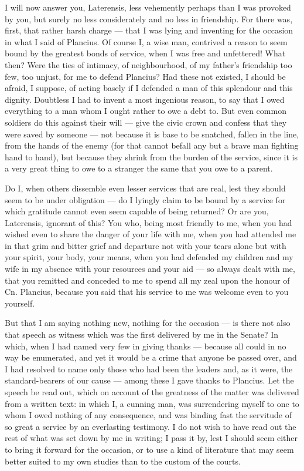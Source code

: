  I will now answer you, Laterensis, less vehemently perhaps than I was provoked by you, but surely no less considerately and no less in friendship. For there was, first, that rather harsh charge --- that I was lying and inventing for the occasion in what I said of Plancius. Of course I, a wise man, contrived a reason to seem bound by the greatest bonds of service, when I was free and unfettered! What then? Were the ties of intimacy, of neighbourhood, of my father's friendship too few, too unjust, for me to defend Plancius? Had these not existed, I should be afraid, I suppose, of acting basely if I defended a man of this splendour and this dignity. Doubtless I had to invent a most ingenious reason, to say that I owed everything to a man whom I ought rather to owe a debt to. But even common soldiers do this against their will --- give the civic crown and confess that they were saved by someone --- not because it is base to be snatched, fallen in the line, from the hands of the enemy (for that cannot befall any but a brave man fighting hand to hand), but because they shrink from the burden of the service, since it is a very great thing to owe to a stranger the same that you owe to a parent.

 Do I, when others dissemble even lesser services that are real, lest they should seem to be under obligation --- do I lyingly claim to be bound by a service for which gratitude cannot even seem capable of being returned? Or are you, Laterensis, ignorant of this? You who, being most friendly to me, when you had wished even to share the danger of your life with me, when you had attended me in that grim and bitter grief and departure not with your tears alone but with your spirit, your body, your means, when you had defended my children and my wife in my absence with your resources and your aid --- so always dealt with me, that you remitted and conceded to me to spend all my zeal upon the honour of Cn. Plancius, because you said that his service to me was welcome even to you yourself.

 But that I am saying nothing new, nothing for the occasion --- is there not also that speech as witness which was the first delivered by me in the Senate? In which, when I had named very few in giving thanks --- because all could in no way be enumerated, and yet it would be a crime that anyone be passed over, and I had resolved to name only those who had been the leaders and, as it were, the standard-bearers of our cause --- among these I gave thanks to Plancius. Let the speech be read out, which on account of the greatness of the matter was delivered from a written text: in which I, a cunning man, was surrendering myself to one to whom I owed nothing of any consequence, and was binding fast the servitude of so great a service by an everlasting testimony. I do not wish to have read out the rest of what was set down by me in writing; I pass it by, lest I should seem either to bring it forward for the occasion, or to use a kind of literature that may seem better suited to my own studies than to the custom of the courts.

